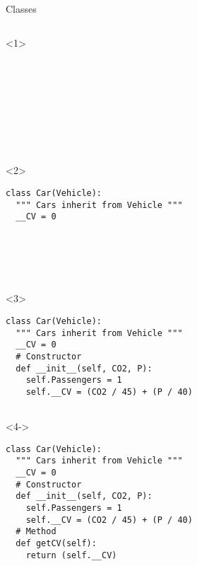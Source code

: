 \begin{frame}[fragile]{Classes}

  \begin{columns}[onlytextwidth]
    \begin{column}{\textwidth}

      \begin{onlyenv}<1>
        \begin{lstlisting}[style=python]









 \end{lstlisting}
      \end{onlyenv}

      \begin{onlyenv}<2>
        \begin{lstlisting}[style=python]
class Car(Vehicle):
  """ Cars inherit from Vehicle """
  __CV = 0






 \end{lstlisting}
      \end{onlyenv}

      \begin{onlyenv}<3>
        \begin{lstlisting}[style=python]
class Car(Vehicle):
  """ Cars inherit from Vehicle """
  __CV = 0
  # Constructor
  def __init__(self, CO2, P):
    self.Passengers = 1
    self.__CV = (CO2 / 45) + (P / 40)


 \end{lstlisting}
      \end{onlyenv}

      \begin{onlyenv}<4->
        \begin{lstlisting}[style=python]
class Car(Vehicle):
  """ Cars inherit from Vehicle """
  __CV = 0
  # Constructor
  def __init__(self, CO2, P):
    self.Passengers = 1
    self.__CV = (CO2 / 45) + (P / 40)
  # Method
  def getCV(self):
    return (self.__CV) \end{lstlisting}
      \end{onlyenv}

    \end{column}
  \end{columns}

\end{frame}



